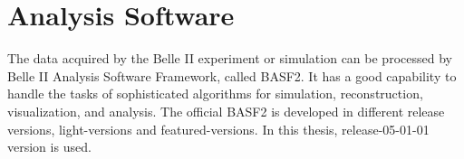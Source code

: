 \begin{comment}
The mixing of background is then implemented to provide a realistic view of physical events and beam background overlay. Since the format of beam background is simulated hits, thus adding the background events is done by injecting the simulated hits, then move to the digitization of hits to detector responses. In a event time window $\Delta t$, assuming the given type background has a average rate of $R$, the mixing number of background hits in such event is: 

\begin{equation}
\bar{N} = sR\Delta{t}
\end{equation}

$s$ is optional scaling factor which can be used to study the influence of given type background in different level. Because $R$ is averaged value, in the actual mixing, the number of $\bar{N}$ is used as the expected value of Poisson distribution, which presents the number of observed events when many trials of such events is made with certain small possibility per event.  In order to simulate the effect of timing different of background and physical events, the mixing timing window over $\Delta t$ is randomly shift according to the physical events.
With the real experimental data comes in handy, the method of adding background events to physics events is slightly different since using real beam background can provide a more precise result than simulation. By setting a random trigger for beam background, the hits digitization from real beam background will be collected and add to simulated physics events. Although the pile-up noise collected in this method is not very precise because of the threshold set for detectors allowing only part of noise to be added, the non-recorded noise can still contribute to the pile-up noise for physics events, and they are not included in this method. Yet overall it provides a more realistic evaluation of beam background overlay.

\end{comment}

\section{Analysis Software} 
The data acquired by the Belle II experiment or simulation can be processed by  Belle II Analysis Software Framework, called BASF2. It has a good capability to handle the tasks of sophisticated algorithms for simulation, reconstruction, visualization, and analysis. The official BASF2 is developed in different release versions, light-versions and featured-versions. In this thesis, release-05-01-01 version is used. 

